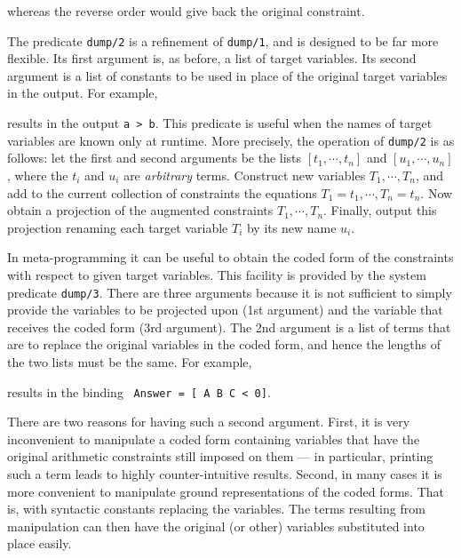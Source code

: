 
\noindent
whereas the reverse order would give back the original constraint.


The predicate {\tt dump/2} is a refinement of {\tt dump/1},
and is designed to be far more flexible.
Its first argument is, as before, a list of target variables.
Its second argument is a list of constants to be used in place of
the original target variables in the output.  For example,


\noindent
results in the output {\tt a > b}.  This predicate is useful
when the names of target variables are known only at runtime. 
More precisely, the operation of {\tt dump/2} is as follows:
let the first and second arguments be the lists 
$[t_1, \cdots , t_n]$ and $[u_1, \cdots , u_n]$,
where the $t_i$ and $u_i$ are {\em arbitrary} terms.
Construct new variables $T_1, \cdots , T_n$, and add to the current
collection of constraints the equations 
$T_1 = t_1, \cdots , T_n = t_n$.
Now obtain a projection of the augmented constraints \wrt
$T_1, \cdots , T_n$.
Finally, output this projection renaming each target variable $T_i$ 
by its new name $u_i$.

In meta-programming it can be useful to obtain the coded form of 
the constraints with respect to given target variables. 
This facility is provided by the system predicate {\tt dump/3}.
There are three arguments because it is not sufficient to simply
provide the variables to be projected upon (1st argument) and the variable
that receives the coded form (3rd argument). The 2nd argument is a list of
terms that are to replace the original variables in the coded form, and hence
the lengths of the two lists must be the same. 
For example,


\noindent
results in the binding \ 
{\tt Answer = [\unintt{-} A \unintt{+} B \unintt{+} C < 0]}.

There are two reasons for having such a second argument.
First, it is very inconvenient to manipulate a coded form containing variables
that have the original arithmetic constraints still imposed on them --- in
particular, printing such a term leads to highly counter-intuitive results.
Second, in many cases it is more convenient to manipulate ground
representations of the coded forms. That is, with syntactic constants
replacing the variables. The terms resulting from manipulation can then have
the original (or other) variables substituted into place easily.

